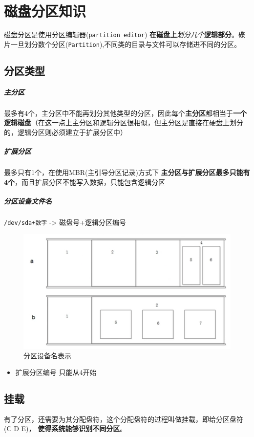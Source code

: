 \documentclass[UTF8,a4paper,12pt]{ctexbook}
\begin{document}
		\section{磁盘分区知识}
			 磁盘分区是使用分区编辑器(\verb|partition editor|) \textbf{在磁盘上}\textit{划分几个}\textbf{逻辑部分}。碟片一旦划分数个分区(\verb|Partition|),不同类的目录与文件可以存储进不同的分区。
			 
			 \subsection{分区类型}
				 \subparagraph{主分区}
					 最多有4个，主分区中不能再划分其他类型的分区，因此每个\textbf{主分区}都相当于\textbf{一个逻辑磁盘}（在这一点上主分区和逻辑分区很相似，但主分区是直接在硬盘上划分的，逻辑分区则必须建立于扩展分区中）
					 
				 \subparagraph{扩展分区}
					 最多只有1个，在使用MBR(主引导分区记录)方式下 \textbf{主分区与扩展分区最多只能有4个}，而且扩展分区不能写入数据，只能包含逻辑分区
				
				\subparagraph{分区设备文件名}	 
					\verb|/dev/sda+数字| -> 磁盘号+逻辑分区编号
					
					\begin{figure}
						\includegraphics[scale = 0.5]{Fenqu.png}
						\caption{分区设备名表示}
					\end{figure}
						\begin{itemize}[itemindent = 1em]
							\item 扩展分区编号 只能从4开始
						\end{itemize}
						
			\subsection{挂载}
				有了分区，还需要为其分配盘符，这个分配盘符的过程叫做挂载，即给分区盘符(C D E)， \textbf{使得系统能够识别不同分区}。
			
\end{document}
